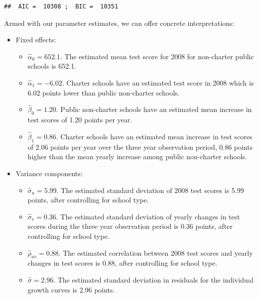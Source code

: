 \documentclass[
]{krantz}
\providecommand{\tightlist}{%
  \setlength{\itemsep}{0pt}\setlength{\parskip}{0pt}}
\begin{document}
\begin{verbatim}
##  AIC =  10308 ;  BIC =  10351
\end{verbatim}

Armed with our parameter estimates, we can offer concrete interpretations:

\begin{itemize}
\item
  Fixed effects:

  \begin{itemize}
  \tightlist
  \item
    \(\hat{\alpha}_{0} = 652.1.\) The estimated mean test score for 2008 for non-charter public schools is 652.1.
  \item
    \(\hat{\alpha}_{1}= -6.02.\) Charter schools have an estimated test score in 2008 which is 6.02 points lower than public non-charter schools.
  \item
    \(\hat{\beta}_{0}= 1.20.\) Public non-charter schools have an estimated mean increase in test scores of 1.20 points per year.
  \item
    \(\hat{\beta}_{1}= 0.86.\) Charter schools have an estimated mean increase in test scores of 2.06 points per year over the three year observation period, 0.86 points higher than the mean yearly increase among public non-charter schools.
  \end{itemize}
\item
  Variance components:

  \begin{itemize}
  \tightlist
  \item
    \(\hat{\sigma}_u= 5.99.\) The estimated standard deviation of 2008 test scores is 5.99 points, after controlling for school type.
  \item
    \(\hat{\sigma}_v= 0.36.\) The estimated standard deviation of yearly changes in test scores during the three year observation period is 0.36 points, after controlling for school type.
  \item
    \(\hat{\rho}_{uv}= 0.88.\) The estimated correlation between 2008 test scores and yearly changes in test scores is 0.88, after controlling for school type.
  \item
    \(\hat{\sigma}= 2.96.\) The estimated standard deviation in residuals for the individual growth curves is 2.96 points.
  \end{itemize}
\end{itemize}
\end{document}

